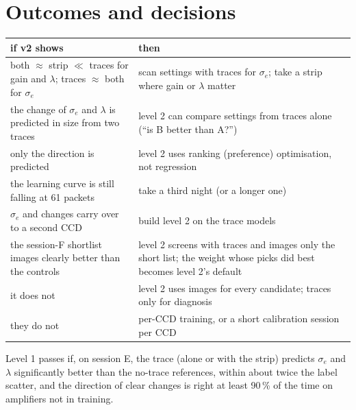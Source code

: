 \documentclass[11pt]{article}
\begin{document}
\section{Outcomes and decisions}
\begin{center}\small
\begin{tabular}{p{6.6cm}p{8.4cm}}\toprule
if v2 shows & then\\\midrule
both $\approx$ strip $\ll$ traces for gain and $\lambda$; traces $\approx$ both for $\sigma_e$ & scan settings with
  traces for $\sigma_e$; take a strip where gain or $\lambda$ matter\\
the change of $\sigma_e$ and $\lambda$ is predicted in size from two traces & level 2 can compare settings from traces
  alone (``is B better than A?'')\\
only the direction is predicted & level 2 uses ranking (preference) optimisation, not regression\\
the learning curve is still falling at 61 packets & take a third night (or a longer one)\\
$\sigma_e$ and changes carry over to a second CCD & build level 2 on the trace models\\
the session-F shortlist images clearly better than the controls & level 2 screens with traces and images only the
  short list; the weight whose picks did best becomes level 2's default\\
it does not & level 2 uses images for every candidate; traces only for diagnosis\\
they do not & per-CCD training, or a short calibration session per CCD\\\bottomrule
\end{tabular}
\end{center}
Level 1 passes if, on session E, the trace (alone or with the strip) predicts $\sigma_e$ and $\lambda$ significantly better
than the no-trace references, within about twice the label scatter, and the direction of clear changes is right at least
90\,\% of the time on amplifiers not in training.
\end{document}

